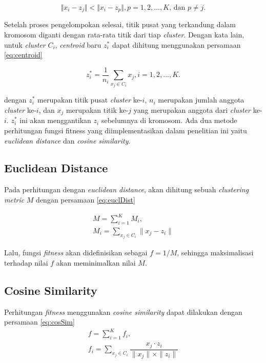 \begin{equation}
\Vert x_i-z_j \Vert < \Vert x_i-z_p \Vert , p=1,2, ... ,K \mbox{, dan } p \neq j.
\end{equation}

Setelah proses pengelompokan selesai, titik pusat yang terkandung dalam kromosom diganti dengan rata-rata titik dari tiap \textit{cluster}. Dengan kata lain, untuk \textit{cluster} $C_i$, \textit{centroid} baru $z_i^*$ dapat dihitung menggunakan persamaan \ref{eq:centroid}

\begin{equation}
\label{eq:centroid}
z_i^*=\frac{1}{n_i} \sum_{x_j\in C_i} x_j,   i=1,2, ... ,K.
\end{equation}

dengan $z_i^*$ merupakan titik pusat \textit{cluster} ke-$i$, $n_i$ merupakan jumlah anggota \textit{cluster} ke-$i$, dan $x_j$ merupakan titik ke-$j$ yang merupakan anggota dari \textit{cluster} ke-$i$. $z_i^*$ ini akan menggantikan $z_i$ sebelumnya di kromosom. Ada dua metode perhitungan fungsi fitness yang diimplementasikan dalam penelitian ini yaitu \textit{euclidean distance} dan \textit{cosine similarity}.

\subsection{Euclidean Distance}
Pada perhitungan dengan \textit{euclidean distance}, akan dihitung sebuah \textit{clustering metric} $M$ dengan persamaan \ref{eq:euclDist}

\begin{equation}
\label{eq:euclDist}
	\begin{gathered}
	M=\sum_{i=1}^K M_i , \\
	M_i=\sum_{x_j\in C_i}\parallel x_j-z_i\parallel
	\end{gathered}
\end{equation}

Lalu, fungsi \textit{fitness} akan didefinisikan sebagai $f=1/M$, sehingga maksimalisasi terhadap nilai $f$ akan meminimalkan nilai $M$.

\subsection{Cosine Similarity}
Perhitungan \textit{fitness} menggunakan \textit{cosine similarity} dapat dilakukan dengan persamaan \ref{eq:cosSim}
\begin{equation}
\label{eq:cosSim}
	\begin{gathered}
	f=\sum_{i=1}^K f_i , \\
	f_i=\sum_{x_j\in C_i}\dfrac{x_j\cdot z_i}{\parallel x_j \parallel \times \parallel z_i \parallel}
	\end{gathered}
\end{equation}

